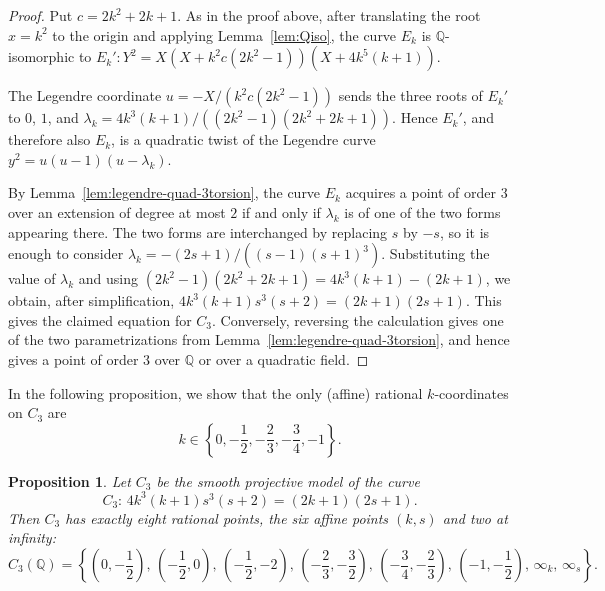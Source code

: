 \documentclass{article}
\theoremstyle{plain}
\newtheorem{proposition}[theorem]{Proposition}
\newcommand{\Q}{\mathbb{Q}}
\begin{document}
\begin{proof}
Put \(c=2k^2+2k+1\). As in the proof above, after translating the root
\(x=k^2\) to the origin and applying Lemma~\ref{lem:Qiso}, the curve \(E_k\)
is \(\Q\)-isomorphic to
\(E_k': Y^2=X(X+k^2c(2k^2-1))(X+4k^5(k+1))\).

The Legendre coordinate \(u=-X/(k^2c(2k^2-1))\) sends the three roots of
\(E_k'\) to \(0\), \(1\), and
\(\lambda_k=4k^3(k+1)/((2k^2-1)(2k^2+2k+1))\). Hence \(E_k'\), and therefore
also \(E_k\), is a quadratic twist of the Legendre curve
\(y^2=u(u-1)(u-\lambda_k)\).

By Lemma~\ref{lem:legendre-quad-3torsion}, the curve \(E_k\) acquires a point
of order \(3\) over an extension of degree at most \(2\) if and only if
\(\lambda_k\) is of one of the two forms appearing there. The two forms are
interchanged by replacing \(s\) by \(-s\), so it is enough to consider
\(\lambda_k=-(2s+1)/((s-1)(s+1)^3)\). Substituting the value of \(\lambda_k\)
and using
\((2k^2-1)(2k^2+2k+1)=4k^3(k+1)-(2k+1)\), we obtain, after simplification,
\(4k^3(k+1)s^3(s+2)=(2k+1)(2s+1)\). This gives the claimed equation for \(C_3\).
Conversely, reversing the calculation gives one of the two parametrizations
from Lemma~\ref{lem:legendre-quad-3torsion}, and hence gives a point of order
\(3\) over \(\Q\) or over a quadratic field.
\end{proof}

In the following proposition, we show that the only (affine) rational \(k\)-coordinates on \(C_3\) are \[ k\in \left\{ 0, -\frac 12, -\frac 23, -\frac 34, -1\right\}.\]

\begin{proposition}\label{prop:C3Q}
    Let \(C_3\) be the smooth projective model of the curve
    \[ C_3:\, 4k^3(k+1)s^3(s+2)=(2k+1)(2s+1). \]
    Then \(C_3\) has exactly eight rational points, the six affine points \( (k,s)\) and two at infinity:
\[ C_3(\Q) = \left\{
\left(0,-\frac12\right),\,
\left(-\frac12,0\right),\,
\left(-\frac12,-2\right),\,
\left(-\frac23,-\frac32\right),\,
\left(-\frac34,-\frac23\right),\,
\left(-1,-\frac12\right),\,
\infty_k,\,
\infty_s
\right\}.\]
\end{proposition}
\end{document}
